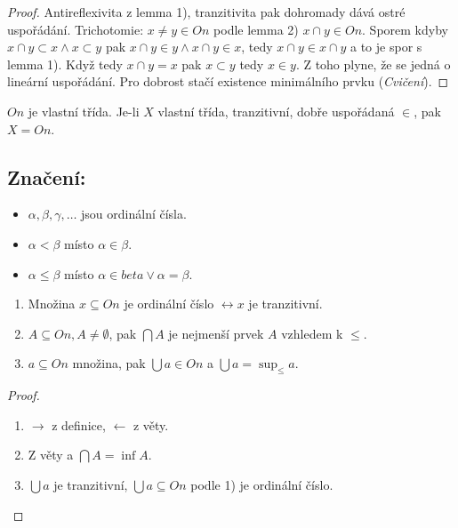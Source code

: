 \begin{proof}
	Antireflexivita z lemma 1), tranzitivita pak dohromady dává ostré uspořádání. Trichotomie: $x \neq y \in On$ podle lemma 2) $x \cap y \in On$. Sporem kdyby $x \cap y \subset x \land x \subset y$ pak $x \cap y \in y \land x \cap y \in x$, tedy $x \cap y \in x \cap y$ a to je spor s lemma 1). Když tedy $x \cap y = x$ pak $x \subset y$ tedy $x \in y$. Z toho plyne, že se jedná o lineární uspořádání. Pro dobrost stačí existence minimálního prvku (\textit{Cvičení}).
\end{proof}

\begin{dusl}
	$On$ je vlastní třída. Je-li $X$ vlastní třída, tranzitivní, dobře uspořádaná $\in$, pak $X = On$.
\end{dusl}


\subsection{Značení:}

\begin{itemize}
	\item $\alpha, \beta, \gamma, \dots$ jsou ordinální čísla.
	\item $\alpha < \beta$ místo $\alpha \in \beta$.
	\item $\alpha \leq \beta$ místo $\alpha \in beta \lor \alpha = \beta$.
\end{itemize}

\begin{lemma}
	\begin{enumerate}
		\item Množina $x \subseteq On$ je ordinální číslo $\leftrightarrow x$ je tranzitivní.
		\item $A \subseteq On, A \neq \emptyset$, pak $\bigcap A$ je nejmenší prvek $A$ vzhledem k $\leq$.
		\item $a \subseteq On$ množina, pak $\bigcup a \in On$ a $\bigcup a = \sup_{\leq}a$.
	\end{enumerate}
\end{lemma}

\begin{proof}
	\begin{enumerate}
		\item $\rightarrow$ z definice, $\leftarrow$ z věty.
		\item Z věty a $\bigcap A = \inf A$.
		\item $\bigcup a$ je tranzitivní, $\bigcup a \subseteq On$ podle 1) je ordinální číslo.
	\end{enumerate}
\end{proof}


